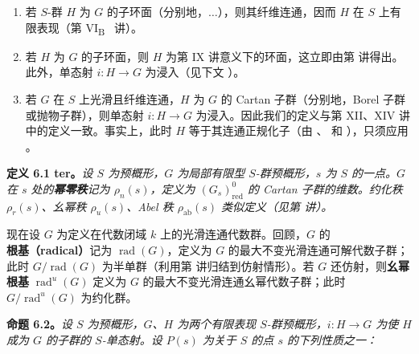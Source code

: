 \begin{enumerate}
\renewcommand{\labelenumi}{\textup{\alph{enumi})}}
\item
  若 \(S\)-群 \(H\) 为 \(G\) 的子环面（分别地，\(\ldots\)），则其纤维连通，因而 \(H\) 在 \(S\) 上有限表现（第 VI\textsubscript{B}~ 讲）。
\item
  若 \(H\) 为 \(G\) 的子环面，则 \(H\) 为第 IX 讲意义下的环面，这立即由第  讲得出。此外，单态射 \(i:H\to G\) 为浸入（见下文 ）。
\item
  若 \(G\) 在 \(S\) 上光滑且纤维连通，\(H\) 为 \(G\) 的 Cartan 子群（分别地，Borel 子群或抛物子群），则单态射 \(i:H\to G\) 为浸入。因此我们的定义与第 XII、XIV 讲中的定义一致。事实上，此时 \(H\) 等于其连通正规化子（由 、 和 ），只须应用 。
\end{enumerate}

\textbf{定义 6.1 ter。}\emph{设 \(S\) 为预概形，\(G\) 为局部有限型 \(S\)-群预概形，\(s\) 为 \(S\) 的一点。\(G\) 在 \(s\) 处的\textbf{幂零秩}记为 \(\rho_n(s)\)，定义为 \((G_s)^0_{\mathrm{red}}\) 的 Cartan 子群的维数。约化秩 \(\rho_r(s)\)、幺幂秩 \(\rho_u(s)\)、Abel 秩 \(\rho_{\mathrm{ab}}(s)\) 类似定义（见第  讲）。}

现在设 \(G\) 为定义在代数闭域 \(k\) 上的光滑连通代数群。回顾，\(G\) 的\textbf{根基（radical）}记为 \(\operatorname{rad}(G)\)，定义为 \(G\) 的最大不变光滑连通可解代数子群；此时 \(G/\operatorname{rad}(G)\) 为半单群（利用第  讲归结到仿射情形）。若 \(G\) 还仿射，则\textbf{幺幂根基} \(\operatorname{rad}^{u}(G)\) 定义为 \(G\) 的最大不变光滑连通幺幂代数子群；此时 \(G/\operatorname{rad}^{u}(G)\) 为约化群。

\textbf{命题 6.2。}\emph{设 \(S\) 为预概形，\(G\)、\(H\) 为两个有限表现 \(S\)-群预概形，\(i:H\to G\) 为使 \(H\) 成为 \(G\) 的子群的 \(S\)-单态射。设 \(P(s)\) 为关于 \(S\) 的点 \(s\) 的下列性质之一：}

